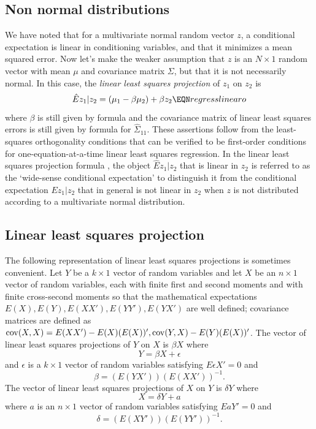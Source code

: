 \subsection{Non normal distributions}\label{sec:nonnormal}%
We have noted that for a multivariate normal   random vector $z$, a conditional expectation is linear in  conditioning variables,
and that it minimizes a mean squared error.  Now let's make the weaker assumption that $z$ is an $N \times 1$ random vector
with mean $\mu$ and covariance matrix $\Sigma$, but that it is not necessarily normal.  In this case, the {\it linear least squares
projection\/} of $z_1$ on $z_2$ is
$$ \hat E z_1 | z_2 = (\mu_1 - \beta \mu_2) +  \beta z_2  \EQN regresslinearo $$
where $\beta$ is still  given by formula  and the covariance matrix of linear  least squares errors
is still given by  formula  for $\hat \Sigma_{11}$. These assertions follow from the least-squares orthogonality conditions
 that can be verified to be   first-order conditions for one-equation-at-a-time linear least squares regression.
In the linear least squares projection formula , the object $\hat E z_1 | z_2$ that is linear in $z_2$ is referred to as the `wide-sense
conditional expectation'
%
 to distinguish it from the conditional expectation  $ E z_1 | z_2$
that in general is not linear in $z_2$ when $z$ is not distributed according to a multivariate normal distribution.
\subsection{Linear least squares projection}\label{sec:lls_compact}%
The following  representation of linear least squares projections is sometimes convenient. Let $Y$ be a $k \times 1$ vector of random variables and let $X$ be
an $n \times 1$ vector of random variables, each with finite first and second moments and with finite cross-second moments so that
the mathematical expectations $E(X), E(Y), E (X X'), E(Y Y'), E (Y X')$ are well defined; covariance matrices are defined
as ${\rm cov}(X,X) = E (X X') - E(X) (E(X))', {\rm cov} (Y,X) - E(Y) (E(X))'$.  The vector of linear least squares projections of $Y$ on $X$ is $\beta X$ where
$$ Y = \beta X + \epsilon $$
and  $\epsilon $ is a $k \times 1$ vector of random variables satisfying $E \epsilon X' = 0$ and
$$ \beta = (E (Y X')) (E(X X'))^{-1}. $$
The vector of linear least squares projections of $X$ on $Y$ is $\delta  Y$ where
$$ X = \delta Y + a $$
where $a$ is an $n \times 1$ vector of random variables satisfying $E a Y' = 0$ and
$$ \delta = (E (X Y')) (E(Y Y'))^{-1} .$$




